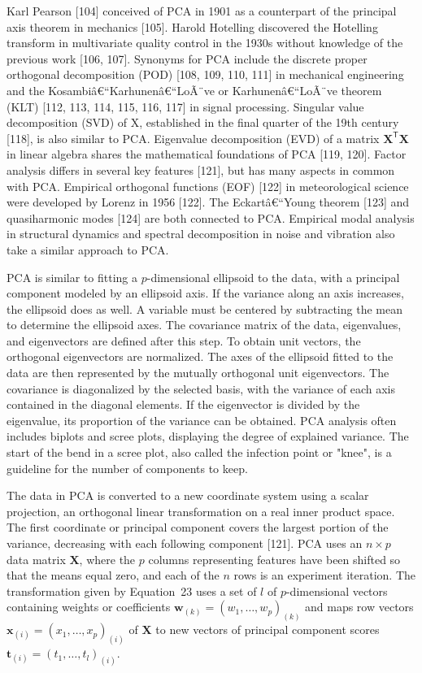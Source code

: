 \documentclass[preprint,12pt]{elsarticle}
\begin{document}
Karl Pearson [104] conceived of PCA in 1901 as a counterpart of the principal axis theorem in mechanics [105]. Harold Hotelling discovered the Hotelling transform in multivariate quality control in the 1930s without knowledge of the previous work [106, 107]. Synonyms for PCA include the discrete proper orthogonal decomposition (POD) [108, 109, 110, 111] in mechanical engineering and the Kosambiâ€“Karhunenâ€“LoÃ¨ve or Karhunenâ€“LoÃ¨ve theorem (KLT) [112, 113, 114, 115, 116, 117] in signal processing. Singular value decomposition (SVD) of X, established in the final quarter of the 19th century [118], is also similar to PCA. Eigenvalue decomposition (EVD) of a matrix $\mathbf{X}^{\mathsf{T}}\mathbf{X}$ in linear algebra shares the mathematical foundations of PCA [119, 120]. Factor analysis differs in several key features [121], but has many aspects in common with PCA. Empirical orthogonal functions (EOF) [122] in meteorological science were developed by Lorenz in 1956 [122]. The Eckartâ€“Young theorem [123] and quasiharmonic modes [124] are both connected to PCA. Empirical modal analysis in structural dynamics and spectral decomposition in noise and vibration also take a similar approach to PCA.

PCA is similar to fitting a $p$-dimensional ellipsoid to the data, with a principal component modeled by an ellipsoid axis. If the variance along an axis increases, the ellipsoid does as well.
A variable must be centered by subtracting the mean to determine the ellipsoid axes. The covariance matrix of the data, eigenvalues, and eigenvectors are defined after this step. To obtain unit vectors, the orthogonal eigenvectors are normalized. The axes of the ellipsoid fitted to the data are then represented by the mutually orthogonal unit eigenvectors. The covariance is diagonalized by the selected basis, with the variance of each axis contained in the diagonal elements. If the eigenvector is divided by the eigenvalue, its proportion of the variance can be obtained.
PCA analysis often includes biplots and scree plots, displaying the degree of explained variance. The start of the bend in a scree plot, also called the infection point or "knee", is a guideline for the number of components to keep.

The data in PCA is converted to a new coordinate system using a scalar projection, an orthogonal linear transformation on a real inner product space. The first coordinate or principal component covers the largest portion of the variance, decreasing with each following component [121].
PCA uses an $n\times p$ data matrix $\mathbf{X}$, where the $p$ columns representing features have been shifted so that the means equal zero, and each of the $n$ rows is an experiment iteration.
The transformation given by Equation~23 uses a set of $l$ of $p$-dimensional vectors containing weights or coefficients $\mathbf{w}_{\left(k\right)}=(w_{1},\dots ,w_{p})_{\left(k\right)}$ and maps row vectors $\mathbf{x}_{\left(i\right)}=(x_{1},\dots ,x_{p})_{\left(i\right)}$ of $\mathbf{X}$ to new vectors of principal component scores $\mathbf{t}_{\left(i\right)}=(t_{1},\dots ,t_{l})_{\left(i\right)}$.
\end{document}
